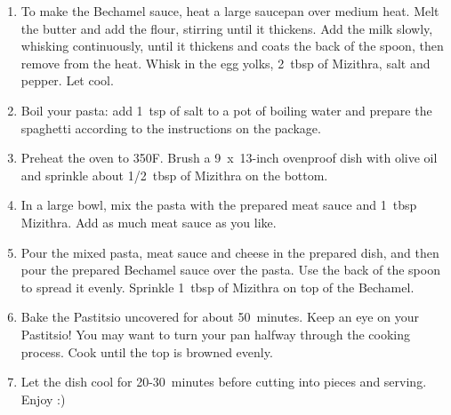 \begin{enumerate}
    \item To make the Bechamel sauce, heat a large saucepan over medium heat. Melt the butter and add the flour, stirring until it thickens. Add the milk slowly, whisking continuously, until it thickens and coats the back of the spoon, then remove from the heat. Whisk in the egg yolks, 2~tbsp of Mizithra, salt and pepper. Let cool.
    \item Boil your pasta: add 1~tsp of salt to a pot of boiling water and prepare the spaghetti according to the instructions on the package.
    \item Preheat the oven to 350\degree F. Brush a 9~x~13-inch ovenproof dish with olive oil and sprinkle about 1/2~tbsp of Mizithra on the bottom.
    \item In a large bowl, mix the pasta with the prepared meat sauce and 1~tbsp Mizithra. Add as much meat sauce as you like.
    \item Pour the mixed pasta, meat sauce and cheese in the prepared dish, and then pour the prepared Bechamel sauce over the pasta. Use the back of the spoon to spread it evenly. Sprinkle 1~tbsp of Mizithra on top of the Bechamel.
    \item Bake the Pastitsio uncovered for about 50~minutes. Keep an eye on your Pastitsio! You may want to turn your pan halfway through the cooking process. Cook until the top is browned evenly.
    \item Let the dish cool for 20-30~minutes before cutting into pieces and serving. Enjoy :)
\end{enumerate}

